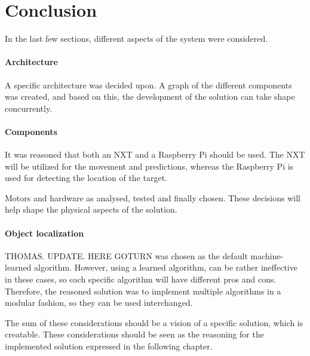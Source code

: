 \section{Conclusion}
In the last few sections, different aspects of the system were considered.

\paragraph{Architecture}
A specific architecture was decided upon.
A graph of the different components was created, and based on this, the development of the solution can take shape concurrently.


\paragraph{Components}
It was reasoned that both an NXT and a Raspberry Pi should be used.
The NXT will be utilized for the movement and predictions, whereas the Raspberry Pi is used for detecting the location of the target.


Motors and hardware as analysed, tested and finally chosen.
These decisions will help shape the physical aspects of the solution.


\paragraph{Object localization}
THOMAS. UPDATE. HERE
GOTURN was chosen as the default machine-learned algorithm.
However, using a learned algorithm, can be rather ineffective in these cases, so each specific algorithm will have different pros and cons.
Therefore, the reasoned solution was to implement multiple algorithms in a modular fashion, so they can be used interchanged.


The sum of these considerations should be a vision of a specific solution, which is creatable.
These considerations should be seen as the reasoning for the implemented solution expressed in the following chapter.
